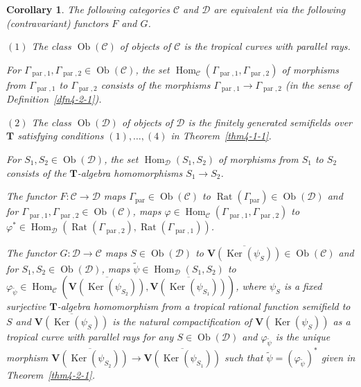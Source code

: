 \documentclass[a4paper,12pt]{amsart}
\newtheorem{cor}[dfn]{Corollary}
\def\Gamma{\varGamma}
\begin{document}
\begin{cor}
    \label{cor4-2-1}
The following categories $\mathscr{C}$ and $\mathscr{D}$ are equivalent via the following (contravariant) functors $F$ and $G$.

$(1)$ The class $\operatorname{Ob}(\mathscr{C})$ of objects of $\mathscr{C}$ is the tropical curves with parallel rays.

For $\Gamma_{\operatorname{par}, 1}, \Gamma_{\operatorname{par}, 2} \in \operatorname{Ob}(\mathscr{C})$, the set $\operatorname{Hom}_{\mathscr{C}}(\Gamma_{\operatorname{par}, 1}, \Gamma_{\operatorname{par}, 2})$ of morphisms from $\Gamma_{\operatorname{par}, 1}$ to $\Gamma_{\operatorname{par}, 2}$ consists of the morphisms $\Gamma_{\operatorname{par}, 1} \to \Gamma_{\operatorname{par}, 2}$ (in the sense of Definition~\ref{dfn4-2-1}).

$(2)$ The class $\operatorname{Ob}(\mathscr{D})$ of objects of $\mathscr{D}$ is the finitely generated semifields over $\boldsymbol{T}$ satisfying conditions $(1), \ldots, (4)$ in Theorem~\ref{thm4-1-1}.

For $S_1, S_2 \in \operatorname{Ob}(\mathscr{D})$, the set $\operatorname{Hom}_{\mathscr{D}}(S_1, S_2)$ of morphisms from $S_1$ to $S_2$ consists of the $\boldsymbol{T}$-algebra homomorphisms $S_1 \to S_2$.

The functor $F \colon \mathscr{C} \to \mathscr{D}$ maps $\Gamma_{\operatorname{par}} \in \operatorname{Ob}(\mathscr{C})$ to $\operatorname{Rat}(\Gamma_{\operatorname{par}}) \in \operatorname{Ob}(\mathscr{D})$ and for $\Gamma_{\operatorname{par}, 1}, \Gamma_{\operatorname{par}, 2} \in \operatorname{Ob}(\mathscr{C})$, maps $\varphi \in \operatorname{Hom}_{\mathscr{C}}(\Gamma_{\operatorname{par}, 1}, \Gamma_{\operatorname{par}, 2})$ to $\varphi^{\ast} \in \operatorname{Hom}_{\mathscr{D}}(\operatorname{Rat}(\Gamma_{\operatorname{par}, 2}), \operatorname{Rat}(\Gamma_{\operatorname{par}, 1}))$.

The functor $G \colon \mathscr{D} \to \mathscr{C}$ maps $S \in \operatorname{Ob}(\mathscr{D})$ to $\overline{\boldsymbol{V}(\operatorname{Ker}(\psi_S))} \in \operatorname{Ob}(\mathscr{C})$ and for $S_1, S_2 \in \operatorname{Ob}(\mathscr{D})$, maps $\widetilde{\psi} \in \operatorname{Hom}_{\mathscr{D}}(S_1, S_2)$ to $\varphi_{\widetilde{\psi}} \in \operatorname{Hom}_{\mathscr{C}}(\overline{\boldsymbol{V}(\operatorname{Ker}(\psi_{S_2}))}, \overline{\boldsymbol{V}(\operatorname{Ker}(\psi_{S_1}))})$, where $\psi_S$ is a fixed surjective $\boldsymbol{T}$-algebra homomorphism from a tropical rational function semifield to $S$ and $\overline{\boldsymbol{V}(\operatorname{Ker}(\psi_S))}$ is the natural compactification of $\boldsymbol{V}(\operatorname{Ker}(\psi_S))$ as a tropical curve with parallel rays for any $S \in \operatorname{Ob}(\mathscr{D})$ and $\varphi_{\widetilde{\psi}}$ is the unique morphism $\overline{\boldsymbol{V}(\operatorname{Ker}(\psi_{S_2}))} \to \overline{\boldsymbol{V}(\operatorname{Ker}(\psi_{S_1}))}$ such that $\widetilde{\psi} = \left(\varphi_{\widetilde{\psi}}\right)^{\ast}$ given in Theorem~\ref{thm4-2-1}.
\end{cor}
\end{document}
